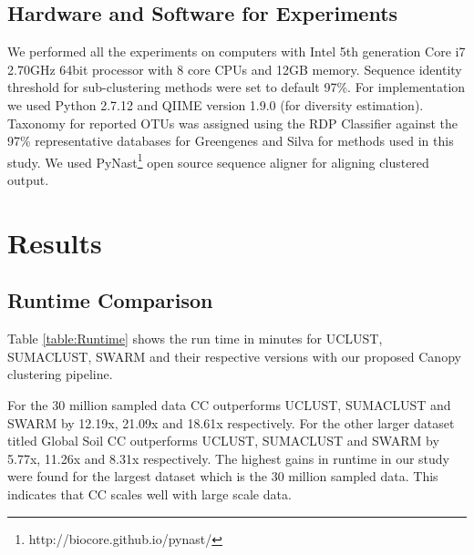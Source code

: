 \documentclass[10pt, conference, compsocconf]{IEEEtran}
\begin{document}

    

\subsection{\textbf{Hardware and Software for Experiments}}
We performed all the experiments on computers with Intel 5th generation Core i7 2.70GHz 64bit processor with 8 core CPUs and 
12GB memory. Sequence identity threshold for  
sub-clustering methods were set to default 97\%. For implementation we 
used Python 2.7.12 and QIIME \cite{MARQiime} version 1.9.0 (for diversity estimation).  Taxonomy for reported OTUs was assigned 
using the RDP Classifier \cite{MARRdp} against the 97\% representative databases for Greengenes \cite{MARGreen1} and Silva \cite{MARSilva} 
for methods used in this study. We used PyNast\footnote{http://biocore.github.io/pynast/} open source sequence aligner
  for aligning clustered output. 

\section{Results} 
\label{sec:Results}

\subsection{\textbf{Runtime Comparison}} Table \ref{table:Runtime} shows the run time in minutes for 
UCLUST, SUMACLUST, SWARM and their respective versions with our proposed Canopy clustering pipeline.


For the 30 million sampled data CC outperforms UCLUST, SUMACLUST and SWARM by 12.19x, 21.09x and 18.61x respectively. For the other larger dataset titled Global Soil CC outperforms UCLUST, SUMACLUST and SWARM by 5.77x, 11.26x and 8.31x respectively. The highest gains in runtime in our study were found for the largest dataset which is the 30 million sampled data. This indicates that CC scales well with large scale data.  
\end{document}
